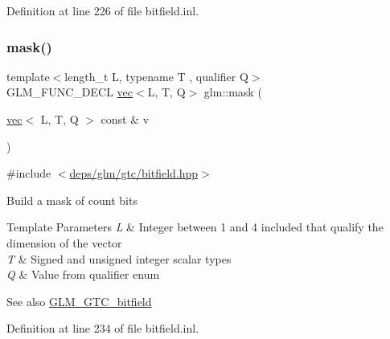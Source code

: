Definition at line 226 of file bitfield.\+inl.

\mbox{\label{group__gtc__bitfield_ga2e64e3b922a296033b825311e7f5fff1}} 
\subsubsection{\texorpdfstring{mask()}{mask()}\hspace{0.1cm}{\footnotesize\ttfamily [2/2]}}
{\footnotesize\ttfamily template$<$length\+\_\+t L, typename T , qualifier Q$>$ \\
G\+L\+M\+\_\+\+F\+U\+N\+C\+\_\+\+D\+E\+CL \hyperlink{structglm_1_1vec}{vec}$<$L, T, Q$>$ glm\+::mask (\begin{DoxyParamCaption}\item[{\hyperlink{structglm_1_1vec}{vec}$<$ L, T, Q $>$ const \&}]{v }\end{DoxyParamCaption})}



{\ttfamily \#include $<$\hyperlink{bitfield_8hpp}{deps/glm/gtc/bitfield.\+hpp}$>$}

Build a mask of \textquotesingle{}count\textquotesingle{} bits


\begin{DoxyTemplParams}{Template Parameters}
{\em L} & Integer between 1 and 4 included that qualify the dimension of the vector \\
\hline
{\em T} & Signed and unsigned integer scalar types \\
\hline
{\em Q} & Value from qualifier enum\\
\hline
\end{DoxyTemplParams}
\begin{DoxySeeAlso}{See also}
\hyperlink{group__gtc__bitfield}{G\+L\+M\+\_\+\+G\+T\+C\+\_\+bitfield} 
\end{DoxySeeAlso}


Definition at line 234 of file bitfield.\+inl.

